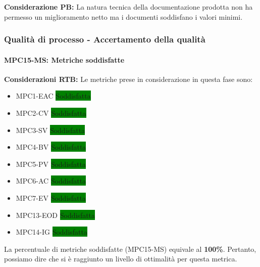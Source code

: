 \vspace{0.5cm}
\noindent \textbf{Considerazione PB:} La natura tecnica della documentazione prodotta non ha permesso un miglioramento netto ma i documenti soddisfano i valori minimi.

\subsubsection{Qualità di processo - Accertamento della qualità}
\paragraph{MPC15-MS: Metriche soddisfatte} \label{sec:accertamento delle qualita}

\noindent \textbf{Considerazioni RTB:}
Le metriche prese in considerazione in questa fase sono:
\begin{itemize}
    \item MPC1-EAC \colorbox{green}{Soddisfatta} 
    \item MPC2-CV \colorbox{green}{Soddisfatta} 
    \item MPC3-SV \colorbox{green}{Soddisfatta}
    \item MPC4-BV \colorbox{green}{Soddisfatta} 
    \item MPC5-PV \colorbox{green}{Soddisfatta} 
    \item MPC6-AC \colorbox{green}{Soddisfatta} 
    \item MPC7-EV \colorbox{green}{Soddisfatta} 
    \item MPC13-EOD \colorbox{green}{Soddisfatta}
    \item MPC14-IG \colorbox{green}{Soddisfatta}
\end{itemize}

\noindent La percentuale di metriche soddisfatte (MPC15-MS) equivale al \textbf{100\%}. Pertanto, possiamo dire che si è raggiunto un livello di ottimalità per questa metrica.

